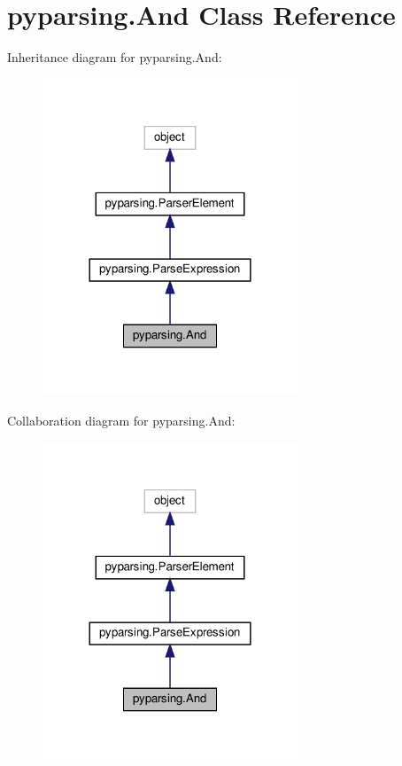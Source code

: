 \hypertarget{classpyparsing_1_1And}{}\section{pyparsing.\+And Class Reference}
\label{classpyparsing_1_1And}


Inheritance diagram for pyparsing.\+And\+:
\nopagebreak
\begin{figure}[H]
\begin{center}
\leavevmode
\includegraphics[width=216pt]{classpyparsing_1_1And__inherit__graph}
\end{center}
\end{figure}


Collaboration diagram for pyparsing.\+And\+:
\nopagebreak
\begin{figure}[H]
\begin{center}
\leavevmode
\includegraphics[width=216pt]{classpyparsing_1_1And__coll__graph}
\end{center}
\end{figure}
